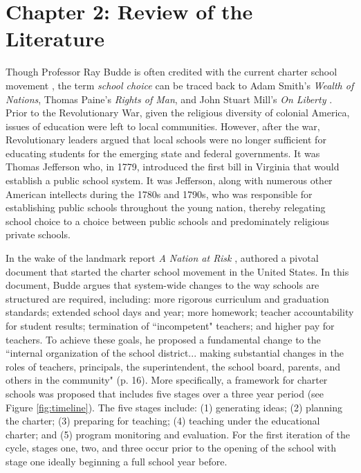 \documentclass[letterpaper,12p,twoside]{article} %
\begin{document}
\cleardoublepage
\section{Chapter 2: Review of the Literature}

Though Professor Ray Budde is often credited with the current charter school movement \cite{Kolderie2005}, the term \textit{school choice} can be traced back to Adam Smith's \textit{Wealth of Nations}, Thomas Paine's \textit{Rights of Man}, and John Stuart Mill's \textit{On Liberty} \cite{herbst2006}. Prior to the Revolutionary War, given the religious diversity of colonial America, issues of education were left to local communities. However, after the war, Revolutionary leaders argued that local schools were no longer sufficient for educating students for the emerging state and federal governments. It was Thomas Jefferson who, in 1779, introduced the first bill in Virginia that would establish a public school system. It was Jefferson, along with numerous other American intellects during the 1780s and 1790s, who was responsible for establishing public schools throughout the young nation, thereby relegating school choice to a choice between public schools and predominately religious private schools.

In the wake of the landmark report \textit{A Nation at Risk} \cite{nationatrisk},  authored a pivotal document that started the charter school movement in the United States. In this document, Budde argues that system-wide changes to the way schools are structured are required, including: more rigorous curriculum and graduation standards; extended school days and year; more homework; teacher accountability for student results; termination of ``incompetent" teachers; and higher pay for teachers. To achieve these goals, he proposed a fundamental change to the ``internal organization of the school district... making substantial changes in the roles of teachers, principals, the superintendent, the school board, parents, and others in the community" (p. 16). More specifically, a framework for charter schools was proposed that includes five stages over a three year period (see Figure \ref{fig:timeline}). The five stages include: (1) generating ideas; (2) planning the charter; (3) preparing for teaching; (4) teaching under the educational charter; and (5) program monitoring and evaluation. For the first iteration of the cycle, stages one, two, and three occur prior to the opening of the school with stage one ideally beginning a full school year before. 
\end{document}
